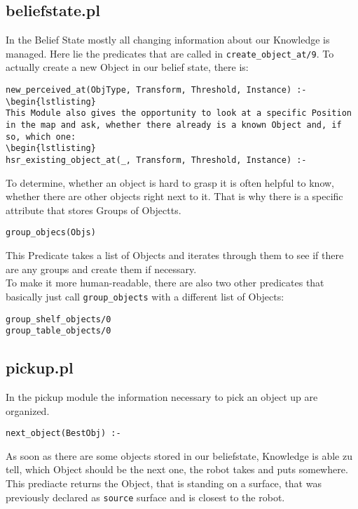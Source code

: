 \documentclass[main.tex]{subfiles}
\begin{document}
\subsection{beliefstate.pl}

In the Belief State mostly all changing information about our Knowledge is managed. Here lie the predicates that are called in \texttt{create\_object\_at/9}. To actually create a new Object in our belief state, there is:
\begin{lstlisting}
new_perceived_at(ObjType, Transform, Threshold, Instance) :-
\begin{lstlisting}
This Module also gives the opportunity to look at a specific Position in the map and ask, whether there already is a known Object and, if so, which one:
\begin{lstlisting}
hsr_existing_object_at(_, Transform, Threshold, Instance) :-
\end{lstlisting}
To determine, whether an object is hard to grasp it is often helpful to know, whether there are other objects right next to it. That is why there is a specific attribute that stores Groups of Objectts. 
\begin{lstlisting}
group_objecs(Objs)
\end{lstlisting}
This Predicate takes a list of Objects and iterates through them to see if there are any groups and create them if necessary.\\
To make it more human-readable, there are also two other predicates that basically just call \texttt{group\_objects} with a different list of Objects:
\begin{lstlisting}
group_shelf_objects/0
group_table_objects/0
\end{lstlisting}

\subsection{pickup.pl}

In the pickup module the information necessary to pick an object up are organized.

\begin{lstlisting}
next_object(BestObj) :-
\end{lstlisting}
As soon as there are some objects stored in our beliefstate, Knowledge is able zu tell, which Object should be the next one, the robot takes and puts somewhere. This prediacte returns the Object, that is standing on a surface, that was previously declared as \texttt{source} surface and is closest to the robot.
\end{document}
